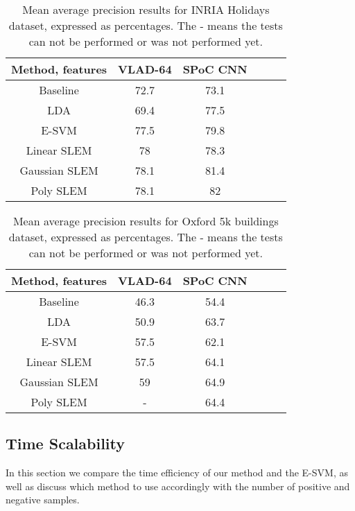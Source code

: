 \begin{table*}[t]
\begin{center}
\begin{tabular}{|c|c|c|c|c|c|}
\hline
Method, features & VLAD-64 \cite{VLAD}& SPoC CNN \cite{babenko15}  \\
\hline\hline
Baseline            & 72.7  & 73.1 \\
LDA                 & 69.4 & 77.5 \\
E-SVM               & 77.5 & 79.8 \\
Linear SLEM         & 78   & 78.3 \\
Gaussian SLEM       & 78.1 & 81.4 \\
Poly SLEM           & 78.1 &  82  \\
\hline
\end{tabular}
\end{center}
\caption{Mean average precision results for INRIA Holidays dataset, expressed as percentages. The - means the tests can not be performed or was not performed yet.}
\end{table*}


\begin{table*}[t]
\begin{center}
\begin{tabular}{|c|c|c|c|c|c|}
\hline
Method, features & VLAD-64 \cite{VLAD} & SPoC CNN \cite{babenko15} \\
\hline\hline
Baseline            & 46.3 & 54.4 \\
LDA                 & 50.9 & 63.7 \\
E-SVM               & 57.5  & 62.1\\
Linear SLEM         & 57.5  & 64.1\\
Gaussian SLEM       & 59    & 64.9\\
Poly SLEM           & -     & 64.4\\
\hline
\end{tabular}
\end{center}
\caption{Mean average precision results for Oxford 5k buildings dataset, expressed as percentages. The - means the tests can not be performed or was not performed yet.}
\end{table*}


\subsection{Time Scalability} \label{time-scale}
In this section we compare the time efficiency of our method and the E-SVM, as well as discuss which method to use accordingly with the number of positive and negative samples.

